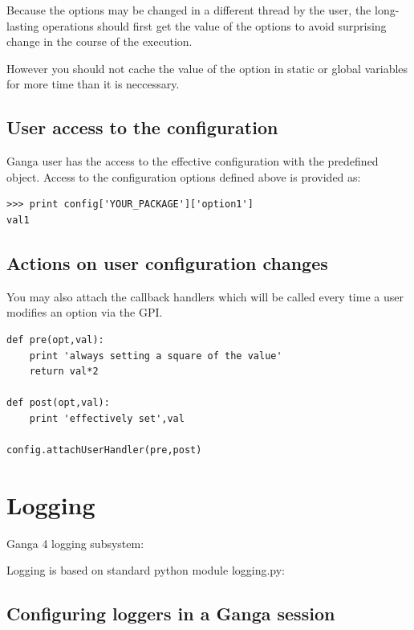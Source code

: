 \documentclass{howto}
\begin{document}
\begin{notice}

Because the options may be changed  in a different thread by the user,
the long-lasting operations should first  get the value of the options
to avoid surprising change in the course of the execution.

However you  should not  cache the  value of the  option in  static or
global variables for more time than it is neccessary.
\end{notice}

\subsection{User access to the configuration}

Ganga user has the access to the effective configuration with the predefined  object.
Access to the configuration options defined above is provided as:
\begin{verbatim}
>>> print config['YOUR_PACKAGE']['option1']
val1
\end{verbatim}

\subsection{Actions on user configuration changes}

You may also attach the callback handlers which will be called every time a user modifies an option via the GPI.

\begin{verbatim}
def pre(opt,val):
    print 'always setting a square of the value'
    return val*2

def post(opt,val):
    print 'effectively set',val
    
config.attachUserHandler(pre,post)
\end{verbatim}


\section{Logging}

Ganga 4 logging subsystem: 


\begin{seealso}
Logging is based on standard python module logging.py:
\end{seealso}

\subsection{Configuring loggers in a Ganga session}
\end{document}
